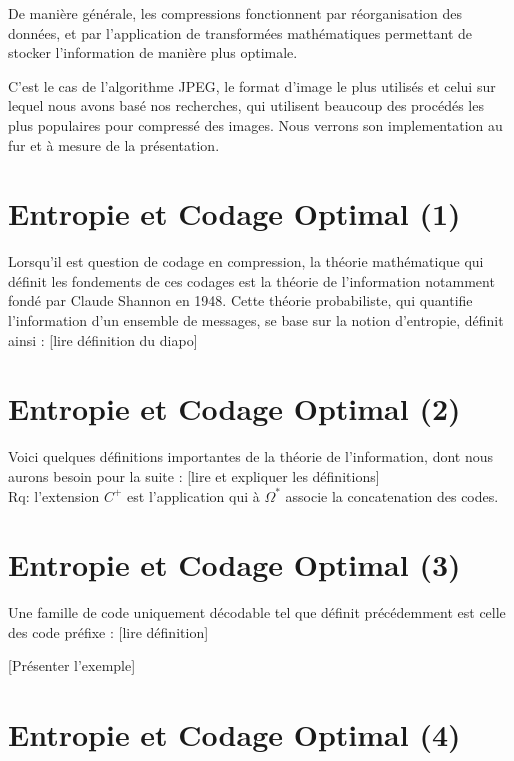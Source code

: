 \documentclass{article}
\begin{document}
De manière générale, les compressions fonctionnent par réorganisation des données, et par l'application de transformées mathématiques
permettant de stocker l'information de manière plus optimale.

C'est le cas de l'algorithme JPEG, le format d'image le plus utilisés et celui sur lequel nous avons basé nos recherches, 
qui utilisent beaucoup des procédés les plus populaires pour compressé des images. Nous verrons son implementation 
au fur et à mesure de la présentation.

\section{Entropie et Codage Optimal (1)}

Lorsqu'il est question de codage en compression, la théorie mathématique qui définit les fondements de ces codages est la théorie
de l'information notamment fondé par Claude Shannon en 1948. Cette théorie probabiliste, qui quantifie l'information d'un ensemble
de messages, se base sur la notion d'entropie, définit ainsi : [lire définition du diapo]

\section{Entropie et Codage Optimal (2)}

Voici quelques définitions importantes de la théorie de l'information, dont nous aurons besoin pour la suite : 
[lire et expliquer les définitions] \\
Rq: l'extension $C^+$ est l'application qui à $\Omega^*$ associe la concatenation des codes.

\section{Entropie et Codage Optimal (3)}

Une famille de code uniquement décodable tel que définit précédemment est celle des code préfixe : [lire définition]

[Présenter l'exemple]

\section{Entropie et Codage Optimal (4)}
\end{document}

